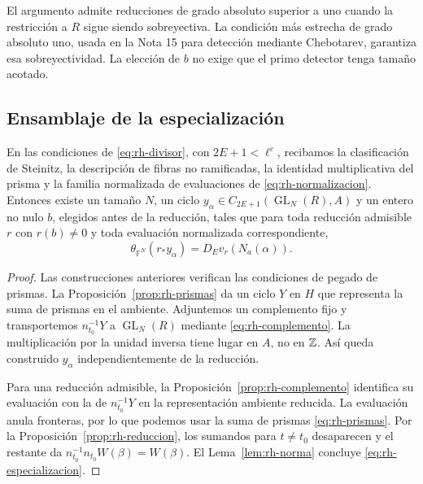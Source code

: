 El argumento admite reducciones de grado absoluto superior a uno cuando la restricción a $R$ sigue siendo sobreyectiva. La condición más estrecha de grado absoluto uno, usada en la Nota 15 para detección mediante Chebotarev, garantiza esa sobreyectividad. La elección de $b$ no exige que el primo detector tenga tamaño acotado.

\subsection{Ensamblaje de la especialización}

\begin{teorema}
\label{thm:rh-especializa}
En las condiciones de \eqref{eq:rh-divisor}, con $2E+1<\ell^c$, recibamos la clasificación de Steinitz, la descripción de fibras no ramificadas, la identidad multiplicativa del prisma y la familia normalizada de evaluaciones de \eqref{eq:rh-normalizacion}. Entonces existe un tamaño $N$, un ciclo $y_\alpha\in C_{2E+1}(\operatorname{GL}_N(R),A)$ y un entero no nulo $b$, elegidos antes de la reducción, tales que para toda reducción admisible $r$ con $r(b)\ne0$ y toda evaluación normalizada correspondiente,
\begin{equation}
 \theta_{\mathbb F^N}(r_*y_\alpha)=D_E v_r(N_a(\alpha)).
 \label{eq:rh-especializacion}
\end{equation}
\end{teorema}
\begin{proof}
Las construcciones anteriores verifican las condiciones de pegado de prismas. La Proposición~\ref{prop:rh-prismas} da un ciclo $Y$ en $H$ que representa la suma de prismas en el ambiente. Adjuntemos un complemento fijo y transportemos $n_{t_0}^{-1}Y$ a $\operatorname{GL}_N(R)$ mediante \eqref{eq:rh-complemento}. La multiplicación por la unidad inversa tiene lugar en $A$, no en $\mathbb{Z}$. Así queda construido $y_\alpha$ independientemente de la reducción.

Para una reducción admisible, la Proposición~\ref{prop:rh-complemento} identifica su evaluación con la de $n_{t_0}^{-1}Y$ en la representación ambiente reducida. La evaluación anula fronteras, por lo que podemos usar la suma de prismas \eqref{eq:rh-prismas}. Por la Proposición~\ref{prop:rh-reduccion}, los sumandos para $t\ne t_0$ desaparecen y el restante da $n_{t_0}^{-1}n_{t_0}W(\beta)=W(\beta)$. El Lema~\ref{lem:rh-norma} concluye \eqref{eq:rh-especializacion}.
\end{proof}

